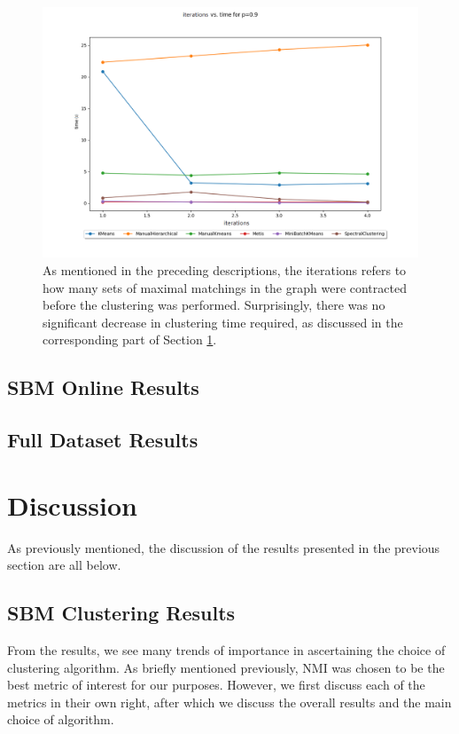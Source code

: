 \documentclass{article}
\begin{document}
\begin{figure}[H]
    \centering
    \includegraphics[width=1.0\textwidth]{results/results_coarsen_time.png}
    \caption[Clustering time vs. coarsening iterations]{As mentioned in the preceding descriptions, the iterations refers to how many sets of maximal matchings in the graph were contracted before the clustering was performed. Surprisingly, there was no significant decrease in clustering time required, as discussed in the corresponding part of Section \ref{discussion}.}
    \label{fig:results_coarsen_time}
\end{figure}

\subsection{SBM Online Results}

\subsection{Full Dataset Results}

\clearpage
\section{Discussion}\label{discussion}
As previously mentioned, the discussion of the results presented in the previous section are all below. 

\subsection{SBM Clustering Results}
From the results, we see many trends of importance in ascertaining the choice of clustering algorithm. As briefly mentioned previously, NMI was chosen to be the best metric of interest for our purposes. However, we first discuss each of the metrics in their own right, after which we discuss the overall results and the main choice of algorithm.
\end{document}
